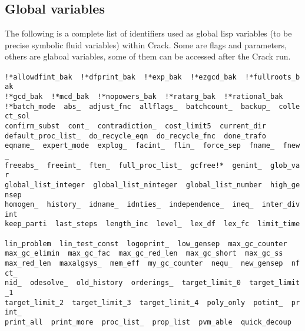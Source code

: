 \documentclass[12pt]{article}
\begin{document}
\subsection{Global variables}
The following is a complete list of identifiers used as global
lisp variables (to be precise symbolic fluid variables)
within {\sc Crack}. Some are flags and parameters, others are glaboal
variables, some of them can be accessed after the {\sc Crack}
run. \vspace{6pt} \\
\noindent
{\tt
!*allowdfint\_bak\ \ !*dfprint\_bak\ \ !*exp\_bak\ \ !*ezgcd\_bak\ \ !*fullroots\_bak\ \ \\
!*gcd\_bak\ \ !*mcd\_bak\ \ !*nopowers\_bak\ \ !*ratarg\_bak\ \ !*rational\_bak\ \ \\
!*batch\_mode\ \ abs\_\ \ adjust\_fnc\ \ allflags\_\ \ batchcount\_\ \ backup\_\ \ collect\_sol\\
confirm\_subst\ \ cont\_\ \ contradiction\_\ \ cost\_limit5\ \ current\_dir\ \ \\
default\_proc\_list\_\ \ do\_recycle\_eqn\ \ do\_recycle\_fnc\ \ done\_trafo\ \ \\
eqname\_\ \ expert\_mode\ \ explog\_\ \ facint\_\ \ flin\_\ \ force\_sep\ \ fname\_\ \ fnew\_\ \ \\
freeabs\_\ \ freeint\_\ \ ftem\_\ \ full\_proc\_list\_\ \ gcfree!*\ \ genint\_\ \ glob\_var\ \ \\
global\_list\_integer\ \ global\_list\_ninteger\ \ global\_list\_number\ \ high\_gensep\ \ \\
homogen\_\ \ history\_\ \ idname\_\ \ idnties\_\ \ independence\_\ \ ineq\_\ \ inter\_divint\ \ \\
keep\_parti\ \ last\_steps\ \ length\_inc\ \ level\_\ \ lex\_df\ \ lex\_fc\ \ limit\_time\ \ \\
lin\_problem\ \ lin\_test\_const\ \ logoprint\_\ \ low\_gensep\ \ max\_gc\_counter\ \ \\
max\_gc\_elimin\ \ max\_gc\_fac\ \ max\_gc\_red\_len\ \ max\_gc\_short\ \ max\_gc\_ss\ \ \\
max\_red\_len\ \ maxalgsys\_\ \ mem\_eff\ \ my\_gc\_counter\ \ nequ\_\ \ new\_gensep\ \ nfct\_\ \ \\
nid\_\ \ odesolve\_\ \ old\_history\ \ orderings\_\ \ target\_limit\_0\ \ target\_limit\_1\ \ \\
target\_limit\_2\ \ target\_limit\_3\ \ target\_limit\_4\ \ poly\_only\ \ potint\_\ \ print\_\ \ \\
print\_all\ \ print\_more\ \ proc\_list\_\ \ prop\_list\ \ pvm\_able\ \ quick\_decoup\ \ \\
}
\end{document}
